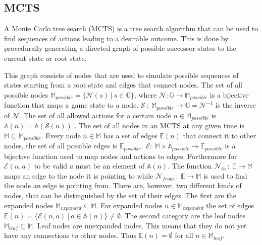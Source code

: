 \documentclass[12pt]{article}
\begin{document}
\subsection{MCTS}
A Monte Carlo tree search (MCTS) is a tree search algorithm that can be used to find sequences of actions leading to a desirable outcome. This is done by procedurally generating a directed graph of possible successor states to the current state or root state. 

This graph consists of nodes that are used to simulate possible sequences of states starting from a root state and edges that connect nodes. The set of all possible nodes \(\mathbb{M}_{possible} = \{\mathcal{N}(s)~|~ s \in \mathbb{G}\}\), where \(\mathcal{N}:\mathbb{G}\to\mathbb{M}_{possible}\) is a bijective function that maps a game state to a node. \(\mathcal{S}~:~\mathbb{M}_{possible}\to\mathbb{G} = \mathcal{N}^{-1}\) is the inverse of \(\mathcal{N}\). The set of all allowed actions for a certain node \(n\in\mathbb{M}_{possible}\) is \(\mathbb{A}(n) = \mathbb{A}(\mathcal{S}(n))\) . The set of all nodes in an MCTS at any given time is \(\mathbb{M} \subseteq \mathbb{M}_{possible}\). Every node \(n \in \mathbb{M}\) has a set of edges \(\mathbb{E}(n)\) that connect it to other nodes, the set of all possible edges is \(\mathbb{E}_{possible}\). \(\mathcal{E}:~\mathbb{M}\times \mathbb{A}_{possible} \to \mathbb{E}_{possible}\) is a bijective function used to map nodes and actions to edges. Furthermore for \(\mathcal{E}(n, a)\) to be valid \(a\) must be an element of \(\mathbb{A}(n)\).  The function \(\mathcal{N}_{to}~:~\mathbb{E}\to\mathbb{M}\) maps an edge to the node it is pointing to while \(\mathcal{N}_{from}~:~\mathbb{E}\to\mathbb{M}\) is used to find the node an edge is pointing from.
There are, however, two different kinds of nodes, that can be distinguished by the set of their edges. The first are the expanded nodes \(\mathbb{M}_{expanded}\subseteq\mathbb{M}\). For expanded nodes \( n\in \mathbb{M}_{expanded}\) the set of edges \(\mathbb{E}(n) = \{\mathcal{E}(n,a)~|~ a\in \mathbb{A}(n)\} \neq \emptyset\). The second category are the leaf nodes \(\mathbb{M}_{leaf} \subseteq \mathbb{M}\). Leaf nodes are unexpanded nodes. This means that they do not yet have any connections to other nodes. Thus \(\mathbb{E}(n) = \emptyset\) for all \(n \in \mathbb{M}_{leaf}\).
\end{document}
